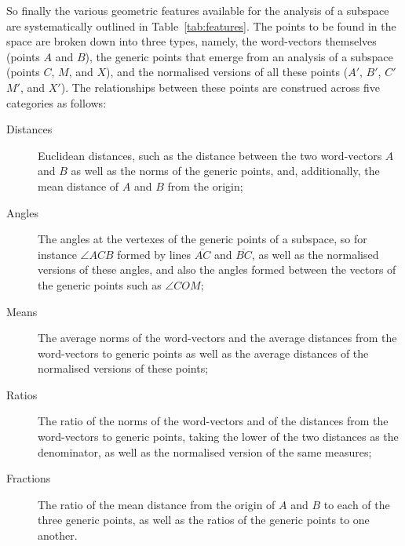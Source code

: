 So finally the various geometric features available for the analysis of a subspace are systematically outlined in Table~\ref{tab:features}.  The points to be found in the space are broken down into three types, namely, the word-vectors themselves (points $A$ and $B$), the generic points that emerge from an analysis of a subspace (points $C$, $M$, and $X$), and the normalised versions of all these points ($A'$, $B'$, $C'$ $M'$, and $X'$).  The relationships between these points are construed across five categories as follows:

\begin{description}
\item[Distances] Euclidean distances, such as the distance between the two word-vectors $A$ and $B$ as well as the norms of the generic points, and, additionally, the mean distance of $A$ and $B$ from the origin;
\item[Angles] The angles at the vertexes of the generic points of a subspace, so for instance $\angle ACB$ formed by lines $\overline{AC}$ and $\overline{BC}$, as well as the normalised versions of these angles, and also the angles formed between the vectors of the generic points such as $\angle COM$;
\item[Means] The average norms of the word-vectors and the average distances from the word-vectors to generic points as well as the average distances of the normalised versions of these points;
\item[Ratios] The ratio of the norms of the word-vectors and of the distances from the word-vectors to generic points, taking the lower of the two distances as the denominator, as well as the normalised version of the same measures;
\item [Fractions] The ratio of the mean distance from the origin of $A$ and $B$ to each of the three generic points, as well as the ratios of the generic points to one another.
\end{description}

